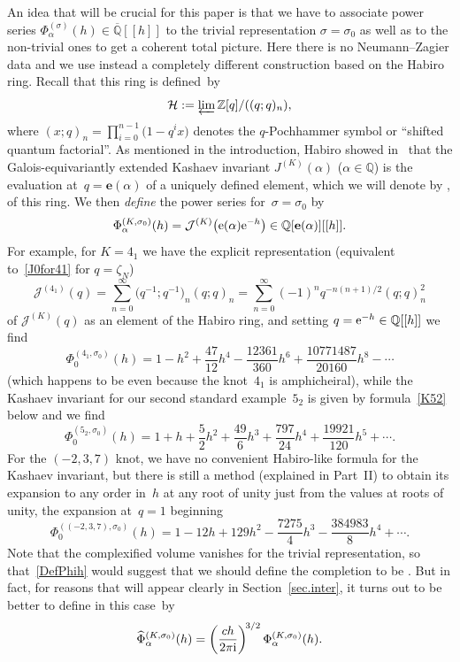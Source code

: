 \documentclass[pdftex]{sigma}
\numberwithin{equation}{section}
\def\calH{\mathcal H}
\def\z{\zeta}
\def\Phih{\widehat\Phi}
\def\e{\mathbf{e}}
\def\a{\alpha}
\def\Z{\mathbb Z}
\def\Q{\mathbb Q}
\def\m{ - }
\def\i{^{-1}}
\def\e{\mathbf{e}}
\def\a{\alpha}
\def\z{\zeta}
\def\s{\sigma}
\def\J{\mathbf J} \def\J{J} %
\def\calJ{\mathcal J} %
\def\Qbar{\overline{\Q}}
\def\be{\begin{equation}}
\def\ee{\end{equation}}
\begin{document}
An idea that will be crucial for this paper is that we have to associate
power series $\Phi_\a^{(\s)}(h)\in\Qbar[[h]]$ to the trivial representation
$\s=\s_0$ as well as to the non-trivial ones to get a coherent total picture.
Here there is no Neumann--Zagier data and we use instead a completely different
construction based on the Habiro ring. Recall that this ring is defined~by
\be
\label{HabDef}
\calH := \varprojlim \Z[q]/((q;q)_n) ,
\ee
where $(x;q)_n=\prod_{i=0}^{n-1}\big(1-q^ix\big)$ denotes the $q$-Pochhammer symbol
or ``shifted quantum factorial''. As mentioned in the introduction, Habiro
showed in~\cite{Ha} that the Galois-equivariantly extended Kashaev
invariant $\J^{(K)}(\a)$ ($\a\in\Q$) is the evaluation at~$q=\e(\a)$ of a
uniquely defined element, which we will denote by \smash{$\calJ^{(K)}(q)$}, of this
ring. We then \emph{define} the power series \smash{$\Phi_\a^{(K,\s)}(h)$} for~$\s=\s_0$ by
\[%
\Phi_\a^{(K,\s_0)}(h) = \calJ^{(K)}\bigl({\rm e}(\a) {\rm e}^{-h}\bigr) \in \Q[\e(\a)][[h]].
\]
For example, for $K=4_1$ we have the explicit representation (equivalent
to~\eqref{J0for41} for $q=\z_N$)
\be
\label{Hab41}
\calJ^{(4_1)}(q) = \sum_{n=0}^\infty \big(q\i;q\i\big)_n (q;q)_n
 = \sum_{n=0}^\infty (-1)^n q^{-n(n+1)/2} (q;q)_n^2
\ee
of $\calJ^{(K)}(q)$ as an element of the Habiro ring, and setting
$q={\rm e}^{-h}\in\Q[[h]]$ we find
\be
\label{41HabAt0}
\Phi^{(4_1,\s_0)}_0(h) = 1 \m h^2 + \frac{47}{12} h^4
\m\frac{12361}{360} h^6 + \frac{10771487}{20160} h^8 \m \cdots
\ee
(which happens to be even because the knot~$4_1$ is amphicheiral),
while the Kashaev invariant for our second standard example~$5_2$
is given by formula~\eqref{K52} below and we find
\[%
\Phi^{(5_2,\s_0)}_0(h) = 1 + h + \frac52 h^2 +\frac{49}6 h^3
+ \frac{797}{24} h^4 + \frac{19921}{120} h^5 + \cdots .
\]
For the $(-2,3,7)$ knot, we have no convenient Habiro-like formula for the
Kashaev invariant, but there is still a method (explained in Part~II) to
obtain its expansion to any order in~$h$ at any root of unity just from
the values at roots of unity, the expansion at~$q=1$ beginning
\[%
\Phi^{((-2,3,7),\s_0)}_0(h) = 1 \m 12 h + 129 h^2 \m \frac{7275}4 h^3
\m \frac{384983}8 h^4 + \cdots .
\]
Note that the complexified volume vanishes for the trivial representation,
so that~\eqref{DefPhih} would suggest that we should define the completion
\smash{$\Phih_\a^{(K,\s_0)}(h)$} to be \smash{$\Phi_\a^{(K,\s_0)}(h)$}. But in fact, for reasons
that will appear clearly in Section~\ref{sec.inter}, it turns out to be better to
define \smash{$\Phih_\a^{(K,\s_0)}(h)$} in this case~by
\begin{gather}
\label{DefPhi0h}
\Phih_\a^{(K,\s_0)}(h)
= \left(\frac{ch}{2\pi {\rm i}}\right)^{\!3/2} \Phi_\a^{(K,\s_0)}(h) .
\end{gather}
\end{document}
